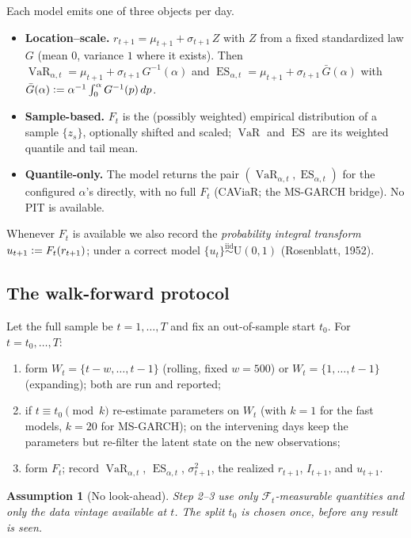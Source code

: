 \documentclass[11pt,a4paper]{article}
\newcommand{\VaR}{\operatorname{VaR}}
\newcommand{\ES}{\operatorname{ES}}
\newcommand{\Fcal}{\mathcal{F}}
\newcommand{\eqdef}{\mathrel{\vcentcolon=}}
\newtheorem{assumption}{Assumption}
\begin{document}
Each model emits one of three objects per day.
\begin{itemize}[nosep]
\item \textbf{Location--scale.} $r_{t+1} = \mu_{t+1} + \sigma_{t+1}\,Z$ with $Z$
      from a fixed standardized law $G$ (mean $0$, variance $1$ where it
      exists). Then $\VaR_{\alpha,t} = \mu_{t+1} + \sigma_{t+1}\,G^{-1}(\alpha)$
      and $\ES_{\alpha,t} = \mu_{t+1} + \sigma_{t+1}\,\bar G(\alpha)$ with
      $\bar G(\alpha)\eqdef \alpha^{-1}\int_0^\alpha G^{-1}(p)\,dp$.
\item \textbf{Sample-based.} $F_t$ is the (possibly weighted) empirical
      distribution of a sample $\{z_s\}$, optionally shifted and scaled;
      $\VaR$ and $\ES$ are its weighted quantile and tail mean.
\item \textbf{Quantile-only.} The model returns the pair
      $(\VaR_{\alpha,t},\ES_{\alpha,t})$ for the configured $\alpha$'s directly,
      with no full $F_t$ (CAViaR; the MS-GARCH bridge). No PIT is available.
\end{itemize}
Whenever $F_t$ is available we also record the \emph{probability integral
transform} $u_{t+1}\eqdef F_t(r_{t+1})$; under a correct model
$\{u_t\}\stackrel{\text{iid}}{\sim}\mathrm{U}(0,1)$ (Rosenblatt, 1952).

\subsection{The walk-forward protocol}\label{sec:wf}

Let the full sample be $t=1,\dots,T$ and fix an out-of-sample start $t_0$. For
$t = t_0,\dots,T$:
\begin{enumerate}[nosep]
\item form $W_t = \{t-w,\dots,t-1\}$ (rolling, fixed $w=500$) or
      $W_t=\{1,\dots,t-1\}$ (expanding); both are run and reported;
\item if $t \equiv t_0 \pmod{k}$ re-estimate parameters on $W_t$ (with
      $k = 1$ for the fast models, $k = 20$ for MS-GARCH); on the intervening
      days keep the parameters but re-filter the latent state on the new
      observations;
\item form $F_t$; record $\VaR_{\alpha,t}$, $\ES_{\alpha,t}$, $\sigma_{t+1}^2$,
      the realized $r_{t+1}$, $I_{t+1}$, and $u_{t+1}$.
\end{enumerate}

\begin{assumption}[No look-ahead]
Step 2--3 use only $\Fcal_t$-measurable quantities and only the data vintage
available at $t$. The split $t_0$ is chosen once, before any result is seen.
\end{assumption}
\end{document}
